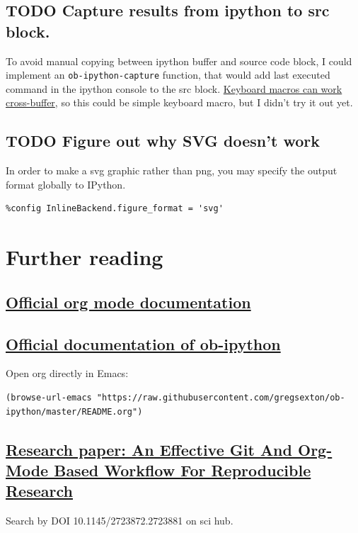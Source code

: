 \documentclass[11pt]{article}
\begin{document}
\subsection{{\bfseries\sffamily TODO} Capture results from ipython to src block.}
\label{sec:orgheadline51}
To avoid manual copying between ipython buffer and source code block, I could implement an \texttt{ob-ipython-capture} function, that would add last executed
command in the ipython console to the src block.
\href{http://stackoverflow.com/questions/27260049/emacs-cross-file-keyboard-macro}{Keyboard macros can work cross-buffer}, so this could be simple keyboard macro, but I didn't try it out yet.
\subsection{{\bfseries\sffamily TODO} Figure out why SVG doesn't work}
\label{sec:orgheadline52}
In order to make a svg graphic rather than png, you may specify the
output format globally to IPython.

\begin{verbatim}
%config InlineBackend.figure_format = 'svg'
\end{verbatim}
\section{Further reading}
\label{sec:orgheadline60}
\subsection{\href{http://orgmode.org/worg/org-tutorials/org-spreadsheet-intro.html}{Official org mode documentation}}
\label{sec:orgheadline54}
\subsection{\href{https://raw.githubusercontent.com/gregsexton/ob-ipython/master/README.org}{Official documentation of ob-ipython}}
\label{sec:orgheadline55}
Open org directly in Emacs:
\begin{verbatim}
(browse-url-emacs "https://raw.githubusercontent.com/gregsexton/ob-ipython/master/README.org")
\end{verbatim}
\subsection{\href{http://dl.acm.org/citation.cfm?id=2723881}{Research paper: An Effective Git And Org-Mode Based Workflow For Reproducible Research}}
\label{sec:orgheadline56}
Search by DOI 10.1145/2723872.2723881 on sci hub.
\end{document}
